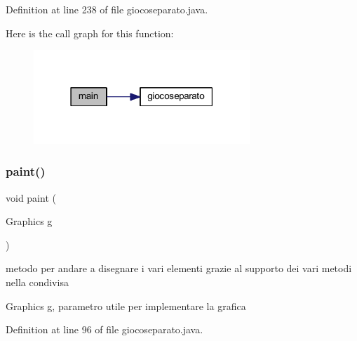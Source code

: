 Definition at line 238 of file giocoseparato.\+java.

Here is the call graph for this function\+:
\nopagebreak
\begin{figure}[H]
\begin{center}
\leavevmode
\includegraphics[width=231pt]{classcargame_1_1giocoseparato_a75988cf84fc6ee7a2ebff36e363021aa_cgraph}
\end{center}
\end{figure}
\mbox{\label{classcargame_1_1giocoseparato_a588c03edd1134c68bb729046b366a3c9}} 
\subsubsection{\texorpdfstring{paint()}{paint()}}
{\footnotesize\ttfamily void paint (\begin{DoxyParamCaption}\item[{Graphics}]{g }\end{DoxyParamCaption})}



metodo per andare a disegnare i vari elementi grazie al supporto dei vari metodi nella condivisa 

Graphics g, parametro utile per implementare la grafica 

Definition at line 96 of file giocoseparato.\+java.

